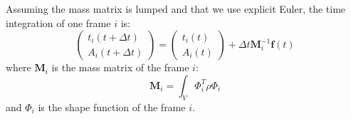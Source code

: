 Assuming the mass matrix is lumped and that we use explicit Euler, the time integration of one frame $i$ is:
\begin{equation}
\displaystyle
\begin{pmatrix}
t_{i}(t+\Delta t) \\
A_{i}(t+\Delta t)
\end{pmatrix} 
=
\begin{pmatrix}
t_{i}(t) \\
A_{i}(t)
\end{pmatrix} 
+
\Delta t
\mathbf{M}_{i}^{-1}
\mathbf{f}(t)
\end{equation}
where $\mathbf{M}_{i}$ is the mass matrix of the frame $i$:
\begin{equation}
\label{eq:massMatrix}
\mathbf{M}_{i} = \int_{V} \Phi_{i}^{T} \rho \Phi_{i}
\end{equation}
and $\Phi_{i}$ is the shape function of the frame $i$.

